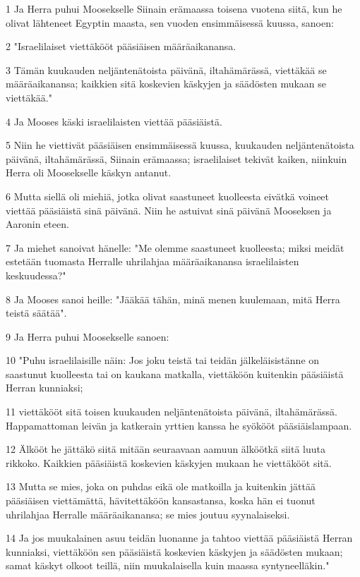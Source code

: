 \par 1 Ja Herra puhui Moosekselle Siinain erämaassa toisena vuotena siitä, kun he olivat lähteneet Egyptin maasta, sen vuoden ensimmäisessä kuussa, sanoen:
\par 2 "Israelilaiset viettäkööt pääsiäisen määräaikanansa.
\par 3 Tämän kuukauden neljäntenätoista päivänä, iltahämärässä, viettäkää se määräaikanansa; kaikkien sitä koskevien käskyjen ja säädösten mukaan se viettäkää."
\par 4 Ja Mooses käski israelilaisten viettää pääsiäistä.
\par 5 Niin he viettivät pääsiäisen ensimmäisessä kuussa, kuukauden neljäntenätoista päivänä, iltahämärässä, Siinain erämaassa; israelilaiset tekivät kaiken, niinkuin Herra oli Moosekselle käskyn antanut.
\par 6 Mutta siellä oli miehiä, jotka olivat saastuneet kuolleesta eivätkä voineet viettää pääsiäistä sinä päivänä. Niin he astuivat sinä päivänä Mooseksen ja Aaronin eteen.
\par 7 Ja miehet sanoivat hänelle: "Me olemme saastuneet kuolleesta; miksi meidät estetään tuomasta Herralle uhrilahjaa määräaikanansa israelilaisten keskuudessa?"
\par 8 Ja Mooses sanoi heille: "Jääkää tähän, minä menen kuulemaan, mitä Herra teistä säätää".
\par 9 Ja Herra puhui Moosekselle sanoen:
\par 10 "Puhu israelilaisille näin: Jos joku teistä tai teidän jälkeläisistänne on saastunut kuolleesta tai on kaukana matkalla, viettäköön kuitenkin pääsiäistä Herran kunniaksi;
\par 11 viettäkööt sitä toisen kuukauden neljäntenätoista päivänä, iltahämärässä. Happamattoman leivän ja katkerain yrttien kanssa he syökööt pääsiäislampaan.
\par 12 Älkööt he jättäkö siitä mitään seuraavaan aamuun älköötkä siitä luuta rikkoko. Kaikkien pääsiäistä koskevien käskyjen mukaan he viettäkööt sitä.
\par 13 Mutta se mies, joka on puhdas eikä ole matkoilla ja kuitenkin jättää pääsiäisen viettämättä, hävitettäköön kansastansa, koska hän ei tuonut uhrilahjaa Herralle määräaikanansa; se mies joutuu syynalaiseksi.
\par 14 Ja jos muukalainen asuu teidän luonanne ja tahtoo viettää pääsiäistä Herran kunniaksi, viettäköön sen pääsiäistä koskevien käskyjen ja säädösten mukaan; samat käskyt olkoot teillä, niin muukalaisella kuin maassa syntyneelläkin."
